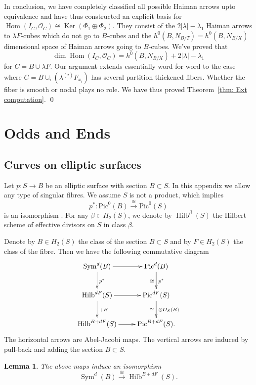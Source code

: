 \documentclass{amsart}
\newtheorem{lemma}[theorem]{Lemma}
\theoremstyle{definition}
\renewcommand{\O}{\mathcal{O}}
\newcommand{\Pic}{\mathrm{Pic}}
\newcommand{\Hom}{\operatorname{Hom}}
\newcommand{\Ker}{\operatorname{Ker}}
\newcommand{\Sym}{\operatorname{Sym}}
\newcommand{\Hilb}{\operatorname{Hilb}}
\begin{document}
In conclusion, we have completely classified all possible Haiman
arrows upto equivalence and have thus constructed an explicit basis
for $\Hom (I_{C},\O_{C})\cong \Ker (\Phi_{1}\oplus \Phi_{2})$. They
consist of the $2|\lambda |-\lambda_{1}$ Haiman arrows to $\lambda
F$-cubes which do not go to $B$-cubes and the
$h^{0}(B,N_{B/T})=h^{0}(B,N_{B/X})$ dimensional space of Haiman arrows
going to $B$-cubes. We've proved that
\[
\dim \Hom (I_{C},\O_{C}) = h^{0}(B,N_{B/X}) + 2|\lambda |-\lambda_{1}
\]
for $C=B\cup \lambda F$. Our argument extends essentially word for
word to the case where $C=B\cup_{i}(\lambda^{(i)}F_{x_{i}})$ has
several partition thickened fibers. Whether the fiber is smooth or
nodal plays no role. We have thus proved Theorem~\ref{thm: Ext
computation}. \qed 


\appendix
\section{Odds and Ends}\label{appendix: odds and ends}

\subsection{Curves on elliptic surfaces}\label{appHilb}

Let $p : S \rightarrow B$ be an elliptic surface with section $B \subset S$. In this appendix we allow any type of singular fibres. We assume $S$ is not a product, which implies
$$
p^* : \Pic^0(B) \stackrel{\cong}{\longrightarrow} \Pic^0(S)
$$
is an isomorphism \cite[VII.1.1]{Miranda}. For any $\beta \in H_2(S)$,
we denote by $\Hilb^\beta(S)$ the Hilbert scheme of effective divisors
on $S$ in class $\beta$.

Denote by $B \in H_2(S)$ the class of the section $B \subset S$ and by $F \in H_2(S)$ the class of the fibre. Then we have the following commutative diagram 
\begin{displaymath}
\xymatrix
{
\Sym^d(B) \ar[d]^{p^*} \ar[r] & \Pic^d(B) \ar[d]^{p^*}_{\cong} \\
\Hilb^{dF}(S) \ar[d]^{+B} \ar[r] & \Pic^{dF}(S) \ar[d]^{\otimes \O_S(B)}_{\cong} \\
\Hilb^{B+dF}(S) \ar[r] & \Pic^{B+dF}(S). 
}
\end{displaymath}
The horizontal arrows are Abel-Jacobi maps. The vertical arrows are induced by pull-back and adding the section $B \subset S$. 
\begin{lemma} \label{Hilbcvs}
The above maps induce an isomorphism
$$
\Sym^d(B) \stackrel{\cong}{\longrightarrow} \Hilb^{B+dF}(S).
$$
\end{lemma}
\end{document}
